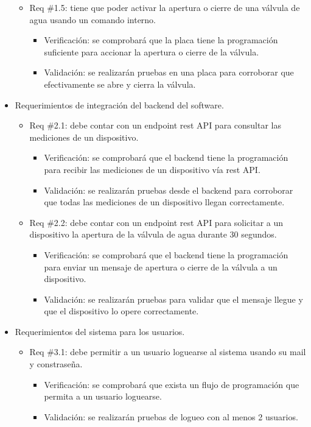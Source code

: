 \documentclass[
11pt, %
codirector, %
]{charter}
\begin{document}
\begin{itemize}
\begin{itemize}
	\item Req \#1.5: tiene que poder activar la apertura o cierre de una válvula de agua usando un comando interno.
		\begin{itemize}
		\item Verificación: se comprobará que la placa tiene la programación suficiente para accionar la apertura o cierre de la válvula.
		\item Validación: se realizarán pruebas en una placa para corroborar que efectivamente se abre y cierra la válvula.\\
		\end{itemize}
		
	\end{itemize}
	
\item Requerimientos de integración del backend del software.
	\begin{itemize}
	\item Req \#2.1: debe contar con un endpoint rest API para consultar las mediciones de un dispositivo.
		\begin{itemize}
		\item Verificación: se comprobará que el backend tiene la programación para recibir las mediciones de un dispositivo vía rest API.
		\item Validación: se realizarán pruebas desde el backend para corroborar que todas las mediciones de un dispositivo llegan correctamente.\\
		\end{itemize}
		
	\item Req \#2.2: debe contar con un endpoint rest API para solicitar a un dispositivo la apertura de la válvula de agua durante 30 segundos.
		\begin{itemize}
		\item Verificación: se comprobará que el backend tiene la programación para enviar un mensaje de apertura o cierre de la válvula a un dispositivo.
		\item Validación: se realizarán pruebas para validar que el mensaje llegue y que el dispositivo lo opere correctamente.\\
		\end{itemize}
		
	\end{itemize}

\item Requerimientos del sistema para los usuarios.
	\begin{itemize}
	\item Req \#3.1: debe permitir a un usuario loguearse al sistema usando su mail y constraseña.
		\begin{itemize}
		\item Verificación: se comprobará que exista un flujo de programación que permita a un usuario loguearse.
		\item Validación: se realizarán pruebas de logueo con al menos 2 usuarios.\\
		\end{itemize}
		

\end{itemize}
\end{itemize}
\end{document}
